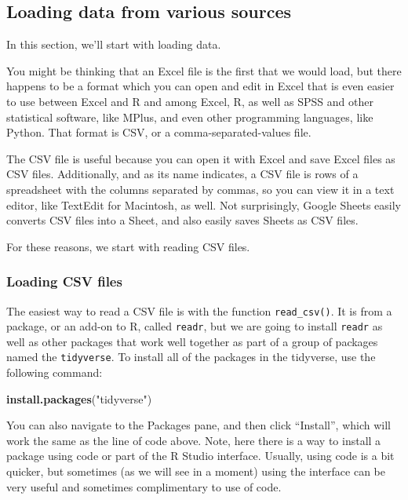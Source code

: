 \documentclass[]{article}
\newenvironment{Shaded}{\begin{snugshade}}{\end{snugshade}}
\newcommand{\KeywordTok}[1]{\textcolor[rgb]{0.13,0.29,0.53}{\textbf{#1}}}
\newcommand{\StringTok}[1]{\textcolor[rgb]{0.31,0.60,0.02}{#1}}
\newcommand{\NormalTok}[1]{#1}
\begin{document}
\subsection{Loading data from various
sources}\label{loading-data-from-various-sources}

In this section, we'll start with loading data.

You might be thinking that an Excel file is the first that we would
load, but there happens to be a format which you can open and edit in
Excel that is even easier to use between Excel and R and among Excel, R,
as well as SPSS and other statistical software, like MPlus, and even
other programming languages, like Python. That format is CSV, or a
comma-separated-values file.

The CSV file is useful because you can open it with Excel and save Excel
files as CSV files. Additionally, and as its name indicates, a CSV file
is rows of a spreadsheet with the columns separated by commas, so you
can view it in a text editor, like TextEdit for Macintosh, as well. Not
surprisingly, Google Sheets easily converts CSV files into a Sheet, and
also easily saves Sheets as CSV files.

For these reasons, we start with reading CSV files.

\subsubsection{Loading CSV files}\label{loading-csv-files}

The easiest way to read a CSV file is with the function
\texttt{read\_csv()}. It is from a package, or an add-on to R, called
\texttt{readr}, but we are going to install \texttt{readr} as well as
other packages that work well together as part of a group of packages
named the \texttt{tidyverse}. To install all of the packages in the
tidyverse, use the following command:

\begin{Shaded}
\begin{Highlighting}[]
\KeywordTok{install.packages}\NormalTok{(}\StringTok{"tidyverse"}\NormalTok{)}
\end{Highlighting}
\end{Shaded}

You can also navigate to the Packages pane, and then click ``Install'',
which will work the same as the line of code above. Note, here there is
a way to install a package using code or part of the R Studio interface.
Usually, using code is a bit quicker, but sometimes (as we will see in a
moment) using the interface can be very useful and sometimes
complimentary to use of code.
\end{document}
